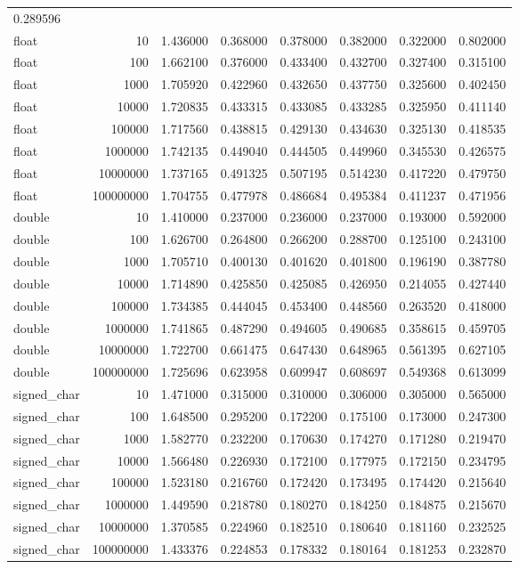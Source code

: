 \documentclass[12pt,fontset=none]{ctexart}
\begin{document}
{\begin{longtable}[]{@{}lrrrrrrr@{}}
0.289596 \\
float & 10 & 1.436000 & 0.368000 & 0.378000 & 0.382000 & 0.322000 &
0.802000 \\
float & 100 & 1.662100 & 0.376000 & 0.433400 & 0.432700 & 0.327400 &
0.315100 \\
float & 1000 & 1.705920 & 0.422960 & 0.432650 & 0.437750 & 0.325600 &
0.402450 \\
float & 10000 & 1.720835 & 0.433315 & 0.433085 & 0.433285 & 0.325950 &
0.411140 \\
float & 100000 & 1.717560 & 0.438815 & 0.429130 & 0.434630 & 0.325130 &
0.418535 \\
float & 1000000 & 1.742135 & 0.449040 & 0.444505 & 0.449960 & 0.345530 &
0.426575 \\
float & 10000000 & 1.737165 & 0.491325 & 0.507195 & 0.514230 & 0.417220
& 0.479750 \\
float & 100000000 & 1.704755 & 0.477978 & 0.486684 & 0.495384 & 0.411237
& 0.471956 \\
double & 10 & 1.410000 & 0.237000 & 0.236000 & 0.237000 & 0.193000 &
0.592000 \\
double & 100 & 1.626700 & 0.264800 & 0.266200 & 0.288700 & 0.125100 &
0.243100 \\
double & 1000 & 1.705710 & 0.400130 & 0.401620 & 0.401800 & 0.196190 &
0.387780 \\
double & 10000 & 1.714890 & 0.425850 & 0.425085 & 0.426950 & 0.214055 &
0.427440 \\
double & 100000 & 1.734385 & 0.444045 & 0.453400 & 0.448560 & 0.263520 &
0.418000 \\
double & 1000000 & 1.741865 & 0.487290 & 0.494605 & 0.490685 & 0.358615
& 0.459705 \\
double & 10000000 & 1.722700 & 0.661475 & 0.647430 & 0.648965 & 0.561395
& 0.627105 \\
double & 100000000 & 1.725696 & 0.623958 & 0.609947 & 0.608697 &
0.549368 & 0.613099 \\
signed\_char & 10 & 1.471000 & 0.315000 & 0.310000 & 0.306000 & 0.305000
& 0.565000 \\
signed\_char & 100 & 1.648500 & 0.295200 & 0.172200 & 0.175100 &
0.173000 & 0.247300 \\
signed\_char & 1000 & 1.582770 & 0.232200 & 0.170630 & 0.174270 &
0.171280 & 0.219470 \\
signed\_char & 10000 & 1.566480 & 0.226930 & 0.172100 & 0.177975 &
0.172150 & 0.234795 \\
signed\_char & 100000 & 1.523180 & 0.216760 & 0.172420 & 0.173495 &
0.174420 & 0.215640 \\
signed\_char & 1000000 & 1.449590 & 0.218780 & 0.180270 & 0.184250 &
0.184875 & 0.215670 \\
signed\_char & 10000000 & 1.370585 & 0.224960 & 0.182510 & 0.180640 &
0.181160 & 0.232525 \\
signed\_char & 100000000 & 1.433376 & 0.224853 & 0.178332 & 0.180164 &
0.181253 & 0.232870 \\
\end{longtable}
}
\end{document}
